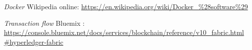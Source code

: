 \begin{thebibliography}{99}
\textit{Docker} Wikipedia online: 
\url{https://en.wikipedia.org/wiki/Docker_\%28software\%29}

\textit{Transaction flow} Bluemix : 
\url{https://console.bluemix.net/docs/services/blockchain/reference/v10\_fabric.html#hyperledger-fabric}



 


\end{thebibliography}
